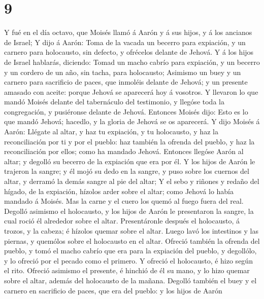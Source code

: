 \hypertarget{section-8}{%
\section{9}\label{section-8}}

 Y fué en el día octavo, que Moisés llamó á Aarón y á sus
hijos, y á los ancianos de Israel;  Y dijo á Aarón: Toma de
la vacada un becerro para expiación, y un carnero para holocausto, sin
defecto, y ofrécelos delante de Jehová.  Y á los hijos de
Israel hablarás, diciendo: Tomad un macho cabrío para expiación, y un
becerro y un cordero de un año, sin tacha, para holocausto; 
Asimismo un buey y un carnero para sacrificio de paces, que inmoléis
delante de Jehová; y un presente amasado con aceite: porque Jehová se
aparecerá hoy á vosotros.  Y llevaron lo que mandó Moisés
delante del tabernáculo del testimonio, y llegóse toda la congregación,
y pusiéronse delante de Jehová.  Entonces Moisés dijo: Esto
es lo que mandó Jehová; hacedlo, y la gloria de Jehová se os aparecerá.
 Y dijo Moisés á Aarón: Llégate al altar, y haz tu
expiación, y tu holocausto, y haz la reconciliación por ti y por el
pueblo: haz también la ofrenda del pueblo, y haz la reconciliación por
ellos; como ha mandado Jehová.  Entonces llegóse Aarón al
altar; y degolló su becerro de la expiación que era por él. 
Y los hijos de Aarón le trajeron la sangre; y él mojó su dedo en la
sangre, y puso sobre los cuernos del altar, y derramó la demás sangre al
pie del altar;  Y el sebo y riñones y redaño del hígado, de
la expiación, hízolos arder sobre el altar; como Jehová lo había mandado
á Moisés.  Mas la carne y el cuero los quemó al fuego fuera
del real.  Degolló asimismo el holocausto, y los hijos de
Aarón le presentaron la sangre, la cual roció él alrededor sobre el
altar.  Presentáronle después el holocausto, á trozos, y la
cabeza; é hízolos quemar sobre el altar.  Luego lavó los
intestinos y las piernas, y quemólos sobre el holocausto en el altar.
 Ofreció también la ofrenda del pueblo, y tomó el macho
cabrío que era para la expiación del pueblo, y degollólo, y lo ofreció
por el pecado como el primero.  Y ofreció el holocausto, é
hizo según el rito.  Ofreció asimismo el presente, é
hinchió de él su mano, y lo hizo quemar sobre el altar, además del
holocausto de la mañana.  Degolló también el buey y el
carnero en sacrificio de paces, que era del pueblo: y los hijos de Aarón
